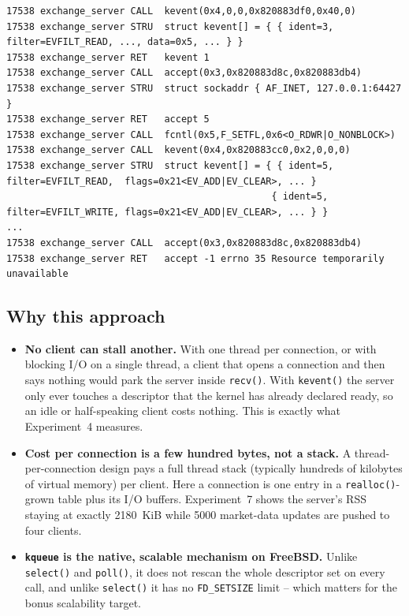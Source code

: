 \documentclass[11pt,a4paper]{article}
\begin{document}
\begin{lstlisting}
17538 exchange_server CALL  kevent(0x4,0,0,0x820883df0,0x40,0)
17538 exchange_server STRU  struct kevent[] = { { ident=3, filter=EVFILT_READ, ..., data=0x5, ... } }
17538 exchange_server RET   kevent 1
17538 exchange_server CALL  accept(0x3,0x820883d8c,0x820883db4)
17538 exchange_server STRU  struct sockaddr { AF_INET, 127.0.0.1:64427 }
17538 exchange_server RET   accept 5
17538 exchange_server CALL  fcntl(0x5,F_SETFL,0x6<O_RDWR|O_NONBLOCK>)
17538 exchange_server CALL  kevent(0x4,0x820883cc0,0x2,0,0,0)
17538 exchange_server STRU  struct kevent[] = { { ident=5, filter=EVFILT_READ,  flags=0x21<EV_ADD|EV_CLEAR>, ... }
                                               { ident=5, filter=EVFILT_WRITE, flags=0x21<EV_ADD|EV_CLEAR>, ... } }
...
17538 exchange_server CALL  accept(0x3,0x820883d8c,0x820883db4)
17538 exchange_server RET   accept -1 errno 35 Resource temporarily unavailable
\end{lstlisting}

\subsection{Why this approach}

\begin{itemize}[leftmargin=1.4em,itemsep=2pt]
  \item \textbf{No client can stall another.}  With one thread per connection, or with
        blocking I/O on a single thread, a client that opens a connection and then says
        nothing would park the server inside \texttt{recv()}.  With
        \texttt{kevent()} the server only ever touches a descriptor that the kernel has
        already declared ready, so an idle or half-speaking client costs nothing.  This
        is exactly what Experiment~4 measures.
  \item \textbf{Cost per connection is a few hundred bytes, not a stack.}  A
        thread-per-connection design pays a full thread stack (typically hundreds of
        kilobytes of virtual memory) per client.  Here a connection is one entry in a
        \texttt{realloc()}-grown table plus its I/O buffers.  Experiment~7 shows the
        server's RSS staying at exactly 2180~KiB while 5000 market-data updates are
        pushed to four clients.
  \item \textbf{\texttt{kqueue} is the native, scalable mechanism on FreeBSD.}  Unlike
        \texttt{select()} and \texttt{poll()}, it does not rescan the whole descriptor
        set on every call, and unlike \texttt{select()} it has no \texttt{FD\_SETSIZE}
        limit -- which matters for the bonus scalability target.
\end{itemize}
\end{document}
